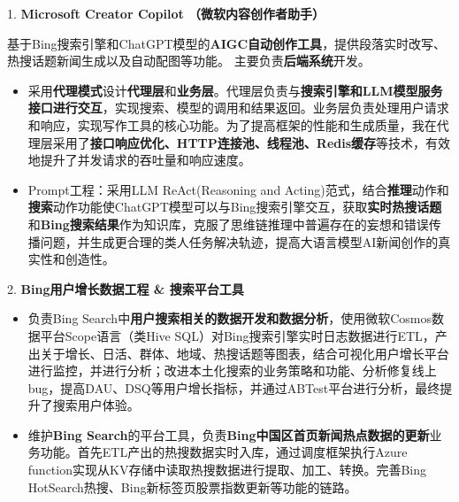 \documentclass{resume}
\begin{document}
  1. \textbf{Microsoft Creator Copilot （微软内容创作者助手）} 
  \begin{spacing}{1.2} 
  基于Bing搜索引擎和ChatGPT模型的\textbf{AIGC自动创作工具}，提供段落实时改写、热搜话题新闻生成以及自动配图等功能。
  主要负责\textbf{后端系统}开发。
  \begin{itemize}
    \item 采用\textbf{代理模式}设计\textbf{代理层}和\textbf{业务层}。代理层负责与\textbf{搜索引擎和LLM模型服务接口进行交互}，实现搜索、模型的调用和结果返回。业务层负责处理用户请求和响应，实现写作工具的核心功能。为了提高框架的性能和生成质量，我在代理层采用了\textbf{接口响应优化、HTTP连接池、线程池、Redis缓存}等技术，有效地提升了并发请求的吞吐量和响应速度。
    \item Prompt工程：采用LLM ReAct(Reasoning and Acting)范式，结合\textbf{推理}动作和\textbf{搜索}动作功能使ChatGPT模型可以与Bing搜索引擎交互，获取\textbf{实时热搜话题}和\textbf{Bing搜索结果}作为知识库，克服了思维链推理中普遍存在的妄想和错误传播问题，并生成更合理的类人任务解决轨迹，提高大语言模型AI新闻创作的真实性和创造性。
  \end{itemize}
  2. \textbf{Bing用户增长数据工程 \& 搜索平台工具}
  \begin{itemize}
    \item 负责Bing Search中\textbf{用户搜索相关的数据开发和数据分析}，使用微软Cosmos数据平台Scope语言（类Hive SQL）对Bing搜索引擎实时日志数据进行ETL，产出关于增长、日活、群体、地域、热搜话题等图表，结合可视化用户增长平台进行监控，并进行分析；改进本土化搜索的业务策略和功能、分析修复线上bug，提高DAU、DSQ等用户增长指标，并通过ABTest平台进行分析，最终提升了搜索用户体验。
    \item 维护\textbf{Bing Search}的平台工具，负责\textbf{Bing中国区首页新闻热点数据的更新}业务功能。首先ETL产出的热搜数据实时入库，通过调度框架执行Azure function实现从KV存储中读取热搜数据进行提取、加工、转换。完善Bing HotSearch热搜、Bing新标签页股票指数更新等功能的链路。
  \end{itemize}
\end{spacing}
 
\end{document}

